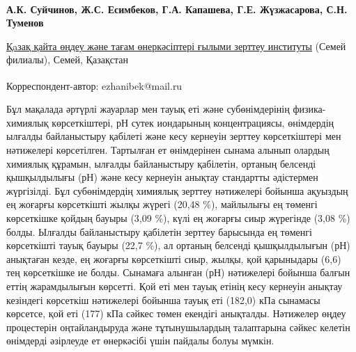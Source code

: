 
\begin{articleheader}

{\bfseries
А.К. Суйчинов,
Ж.С. Есимбеков\textsuperscript{\envelope },
Г.А. Капашева,
Г.Е. Жүзжасарова,
С.Н. Туменов
}
\end{articleheader}

\begin{affiliation}
\href{https://rpf.kz/?lang=kk}{Қaзақ қайта өңдеу және тағам өнеркәсіптері ғылыми зерттеу институты} (Семей филиалы), Семей, Қазақстан

\raggedright \textsuperscript{\envelope }Корреспондент-автор: ezhanibek@mail.ru
\end{affiliation}

Бұл мақалада әртүрлі жауарлар мен тауық еті және субөнімдерінің
физика-химиялық көрсеткіштері, рН сутек иондарының концентрациясы,
өнімдердің ылғалды байланыстыру қабілеті және кесу кернеуін зерттеу
көрсеткіштері мен нәтижелері көрсетілген. Тартылған ет өнімдерінен
сынама алынып олардың химиялық құрамын, ылғалды байланыстыру қабілетін,
ортаның белсенді қышқылдылығы (рН) және кесу кернеуін анықтау стандартты
әдістермен жүргізілді. Бұл субөнімдердің химиялық зерттеу нәтижелері
бойынша ақуыздың ең жоғарғы көрсеткішті жылқы жүрегі (20,48 \%),
майлылығы ең төменгі көрсеткішке қойдың бауыры (3,09 \%), күлі ең
жоғарғы сиыр жүрегінде (3,08 \%) болды. Ылғалды байланыстыру қабілетін
зерттеу барысында ең төменгі көрсеткішті тауық бауыры (22,7 \%), ал
ортаның белсенді қышқылдылығын (рН) анықтаған кезде, ең жоғарғы
көрсеткішті сиыр, жылқы, қой қарыныдары (6,6) тең көрсеткішке ие болды.
Сынамаға алынған (рН) нәтижелері бойынша балғын еттің жарамдылығын
көрсетті. Қой еті мен тауық етінің кесу кернеуін анықтау кезіндегі
көрсеткіш нәтижелері бойынша тауық еті (182,0) кПа сынамасы көрсетсе,
қой еті (177) кПа сәйкес төмен екендігі анықталды. Нәтижелер өңдеу
процестерін оңтайландыруда және тұтынушылардың талаптарына сәйкес
келетін өнімдерді әзірлеуде ет өнеркәсібі үшін пайдалы болуы мүмкін.

